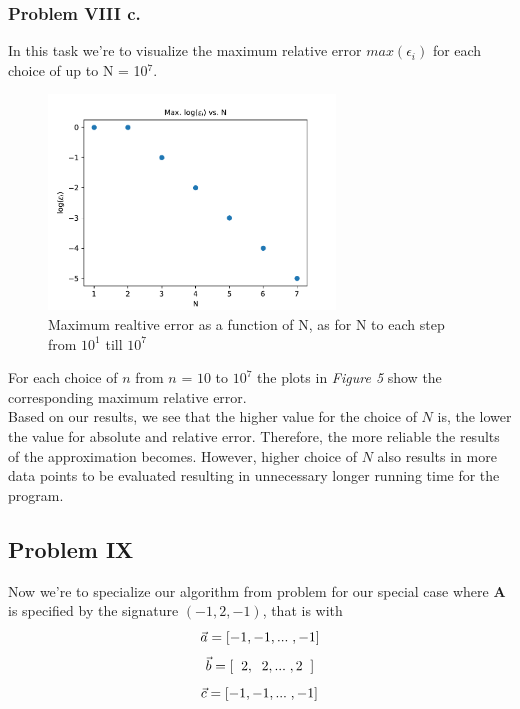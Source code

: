 \documentclass{article}
\begin{document}
\subsubsection*{Problem VIII c.}
In this task we're to visualize the maximum relative error $max(\epsilon_i)$ for each choice of up to N = 10$^7$. 
\begin{figure}[h!]
    \centering
    \includegraphics[width=3in]{Problem8/Log10Max_Relative_Error.pdf}
    \caption{Maximum realtive error as a function of N, as for N to each step from $10^1$ till $10^7$}
    \label{fig:my_label}
\end{figure}

For each choice of $n$ from $n$ = $10$ to $10^7$ the plots in \textit{Figure 5} show the corresponding maximum relative error. \\

Based on our results, we see that the higher value for the choice of $N$ is, the lower the value for absolute and relative error. Therefore, the more reliable the results of the approximation becomes. However, higher choice of $N$ also results in more data points to be evaluated resulting in unnecessary longer running time for the program.



\subsection*{Problem IX} 
Now we're to specialize our algorithm from problem  for our special case where \textbf{A} is specified by the signature $(-1, 2, -1)$, that is with 
\begin{equation*}
    \Vec{a}= [-1,-1,\hspace{0.00001cm}...\hspace{0.1cm},-1]\\
\end{equation*}
\begin{equation*}
    \Vec{b}= [\hspace{0.2cm}2,\hspace{0.2cm}2,\hspace{0.001cm}...\hspace{0.1cm},2\hspace{0.2cm}]\\
\end{equation*}
\begin{equation*}
    \Vec{c}= [-1,-1,\hspace{0.001cm}...\hspace{0.1cm},-1]\\
\end{equation*}
\end{document}
